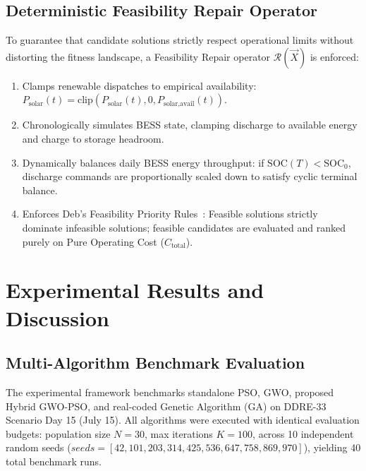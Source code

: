 \documentclass[conference]{IEEEtran}
\begin{document}
\subsection{Deterministic Feasibility Repair Operator}
To guarantee that candidate solutions strictly respect operational limits without distorting the fitness landscape, a Feasibility Repair operator $\mathcal{R}(\vec{X})$ is enforced:
\begin{enumerate}
    \item Clamps renewable dispatches to empirical availability: $P_{\text{solar}}(t) = \text{clip}(P_{\text{solar}}(t), 0, P_{\text{solar,avail}}(t))$.
    \item Chronologically simulates BESS state, clamping discharge to available energy and charge to storage headroom.
    \item Dynamically balances daily BESS energy throughput: if $\text{SOC}(T) < \text{SOC}_0$, discharge commands are proportionally scaled down to satisfy cyclic terminal balance.
    \item Enforces Deb's Feasibility Priority Rules~\cite{deb2000efficient}: Feasible solutions strictly dominate infeasible solutions; feasible candidates are evaluated and ranked purely on Pure Operating Cost ($C_{\text{total}}$).
\end{enumerate}

\section{Experimental Results and Discussion}

\subsection{Multi-Algorithm Benchmark Evaluation}
The experimental framework benchmarks standalone PSO, GWO, proposed Hybrid GWO-PSO, and real-coded Genetic Algorithm (GA) on DDRE-33 Scenario Day 15 (July 15). All algorithms were executed with identical evaluation budgets: population size $N = 30$, max iterations $K = 100$, across 10 independent random seeds ($seeds = [42, 101, 203, 314, 425, 536, 647, 758, 869, 970]$), yielding 40 total benchmark runs.
\end{document}
